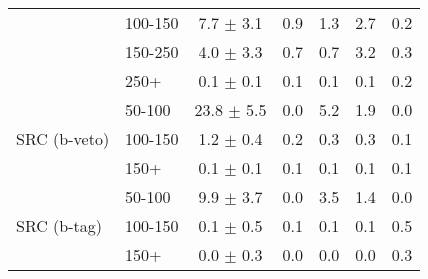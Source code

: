 \begin{table}[ht!]
\begin{tabular}{l l c c c c c}
                      & 100-150  & 7.7  $\pm$ 3.1  & 0.9& 1.3  & 2.7 & 0.2 \\
                      & 150-250  & 4.0  $\pm$ 3.3  & 0.7& 0.7  & 3.2 & 0.3 \\
                      & 250+     & 0.1  $\pm$ 0.1  & 0.1& 0.1  & 0.1 & 0.2 \\ \hline
\multirow{ 3}{*}{SRC (b-veto)}& 50-100   & 23.8  $\pm$ 5.5  & 0.0& 5.2  & 1.9 & 0.0 \\
                     & 100-150  & 1.2   $\pm$ 0.4  & 0.2& 0.3  & 0.3 & 0.1 \\
                     & 150+     & 0.1   $\pm$ 0.1  & 0.1& 0.1  & 0.1 & 0.1 \\\hline
\multirow{ 3}{*}{SRC (b-tag)}& 50-100   & 9.9  $\pm$ 3.7  & 0.0& 3.5  & 1.4 & 0.0 \\
                      & 100-150  & 0.1  $\pm$ 0.5  & 0.1& 0.1  & 0.1 & 0.5 \\
                      & 150+     & 0.0  $\pm$ 0.3  & 0.0& 0.0  & 0.0 & 0.3 \\\hline\hline
\end{tabular}
\end{table}
